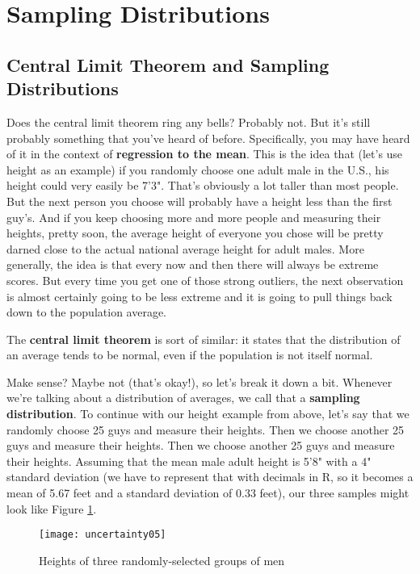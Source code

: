 \section{Sampling Distributions}

\subsection{Central Limit Theorem and Sampling Distributions}
Does the central limit theorem ring any bells? Probably not. But it's still probably something that you've heard of before. Specifically, you may have heard of it in the context of \textbf{regression to the mean}. This is the idea that (let's use height as an example) if you randomly choose one adult male in the U.S., his height could very easily be 7'3". That's obviously a lot taller than most people. But the next person you choose will probably have a height less than the first guy's. And if you keep choosing more and more people and measuring their heights, pretty soon, the average height of everyone you chose will be pretty darned close to the actual national average height for adult males. More generally, the idea is that every now and then there will always be extreme scores. But every time you get one of those strong outliers, the next observation is almost certainly going to be less extreme and it is going to pull things back down to the population average.

The \textbf{central limit theorem} is sort of similar: it states that the distribution of an average tends to be normal, even if the population is not itself normal.

Make sense? Maybe not (that's okay!), so let's break it down a bit. Whenever we're talking about a distribution of averages, we call that a \textbf{sampling distribution}. To continue with our height example from above, let's say that we randomly choose 25 guys and measure their heights. Then we choose another 25 guys and measure their heights. Then we choose another 25 guys and measure their heights. Assuming that the mean male adult height is 5'8" with a 4" standard deviation (we have to represent that with decimals in R, so it becomes a mean of 5.67 feet and a standard deviation of 0.33 feet), our three samples might look like Figure \ref{fig:uncertainty05}.

\begin{figure}[htp]
\texttt{[image: uncertainty05]}
\caption{Heights of three randomly-selected groups of men}
\label{fig:uncertainty05}
\end{figure}

